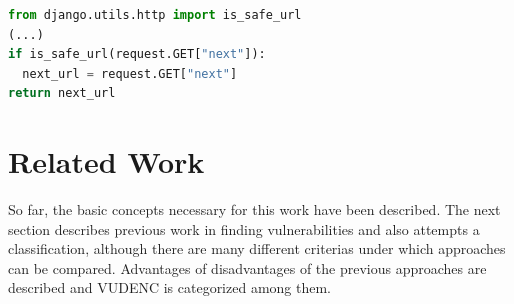 \documentclass[
	a4paper,
	pagesize,
	pdftex,
	12pt,
	twoside, %
	BCOR=5mm, %
	ngerman,
	fleqn,
	final,
	]{scrartcl}
\begin{document}
\begin{lstlisting}[language=Python, showstringspaces=False]
from django.utils.http import is_safe_url
(...)
if is_safe_url(request.GET["next"]):
  next_url = request.GET["next"]
return next_url
\end{lstlisting}





\newpage
\section{Related Work}\label{Related-Work}

So far, the basic concepts necessary for this work have been described. The next section describes previous work in finding vulnerabilities and also attempts a classification, although there are many different criterias under which approaches can be compared. Advantages of disadvantages of the previous approaches are described and VUDENC is categorized among them.
\end{document}
